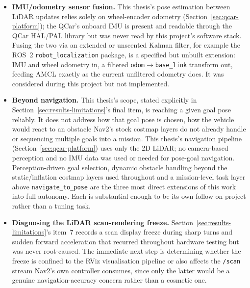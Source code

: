 \begin{itemize}
{    smoother refinement.} Section~\ref{sec:cusp-continued-iteration}'s
    two most recent refinements are the \texttt{min\_lead\_distance}
    fix to the cusp re-extension bug and the curvature-continuing
    extension itself. At the time of writing, both were verified only
    in simulation: a single smoke test for the curvature refinement
    and two trials without directly observing the skip branch fire
    for \texttt{min\_lead\_distance}. Both are strict generalisations
    of the already hardware-validated straight-line mechanism and are
    expected to transfer. This thesis deliberately does not claim
    hardware confirmation it does not have. Repeating
    Section~\ref{sec:cusp-hw-validation}'s two-goal real-vehicle test
    against this refined configuration is the immediate next step.
  \item \textbf{IMU/odometry sensor fusion.} This thesis's pose
    estimation between LiDAR updates relies solely on wheel-encoder
    odometry (Section~\ref{sec:qcar-platform}); the QCar's onboard IMU
    is present and readable through the QCar HAL/PAL library but was
    never read by this project's software stack. Fusing the two via
    an extended or unscented Kalman filter, for example the ROS~2
    \texttt{robot\_localization} package, is a specified but unbuilt
    extension: IMU and wheel odometry in, a filtered
    \texttt{odom}$\rightarrow$\texttt{base\_link} transform out,
    feeding AMCL exactly as the current unfiltered odometry does. It
    was considered during this project but not implemented.
  \item \textbf{Beyond navigation.} This thesis's scope, stated
    explicitly in Section~\ref{sec:results-limitations}'s final item,
    is reaching a given goal pose reliably. It does not address how
    that goal pose is chosen, how the vehicle would react to an
    obstacle Nav2's stock costmap layers do not already handle or
    sequencing multiple goals into a mission. This thesis's navigation
    pipeline (Section~\ref{sec:qcar-platform}) uses only the 2D LiDAR;
    no camera-based perception and no IMU data was used or needed for
    pose-goal navigation. Perception-driven goal selection, dynamic
    obstacle handling beyond the static/inflation costmap layers used
    throughout and a mission-level task layer above
    \texttt{navigate\_to\_pose} are the three most direct extensions
    of this work into full autonomy. Each is substantial enough to be
    its own follow-on project rather than a tuning task.
  \item \textbf{Diagnosing the LiDAR scan-rendering freeze.}
    Section~\ref{sec:results-limitations}'s item~7 records a scan
    display freeze during sharp turns and sudden forward acceleration
    that recurred throughout hardware testing but was never
    root-caused. The immediate next step is determining whether the
    freeze is confined to the RViz visualisation pipeline or also
    affects the \texttt{/scan} stream Nav2's own controller consumes,
    since only the latter would be a genuine navigation-accuracy
    concern rather than a cosmetic one.
\end{itemize}

